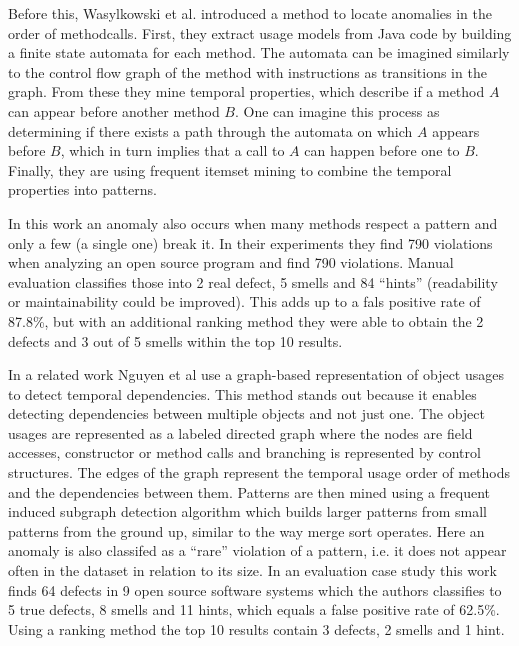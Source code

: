 Before this, Wasylkowski et al. \cite{wasylkowski2007detecting} introduced a method to locate anomalies in the order of methodcalls.
First, they extract usage models from Java code by building a finite state automata for each method.
The automata can be imagined similarly to the control flow graph of the method with instructions as transitions in the graph.
From these they mine temporal properties, which describe if a method $A$ can appear before another method $B$.
One can imagine this process as determining if there exists a path through the automata on which $A$ appears before $B$, which in turn implies that a call to $A$ can happen before one to $B$.
Finally, they are using frequent itemset mining \cite{han2006data} to combine the temporal properties into patterns.

In this work an anomaly also occurs when many methods respect a pattern and only a few (a single one) break it.
In their experiments they find 790 violations when analyzing an open source program and find 790 violations.
Manual evaluation classifies those into 2 real defect, 5 smells and 84 ``hints'' (readability or maintainability could be improved).
This adds up to a fals positive rate of 87.8\%, but with an additional ranking method they were able to obtain the 2 defects and 3 out of 5 smells within the top 10 results.

In a related work Nguyen et al \cite{nguyen2009graph} use a graph-based representation of object usages to detect temporal dependencies.
This method stands out because it enables detecting dependencies between multiple objects and not just one.
The object usages are represented as a labeled directed graph where the nodes are field accesses, constructor or method calls and branching is represented by control structures.
The edges of the graph represent the temporal usage order of methods and the dependencies between them.
Patterns are then mined using a frequent induced subgraph detection algorithm which builds larger patterns from small patterns from the ground up, similar to the way merge sort operates.
Here an anomaly is also classifed as a ``rare'' violation of a pattern, i.e. it does not appear often in the dataset in relation to its size.
In an evaluation case study this work finds 64 defects in 9 open source software systems which the authors classifies to 5 true defects, 8 smells and 11 hints, which equals a false positive rate of 62.5\%.
Using a ranking method the top 10 results contain 3 defects, 2 smells and 1 hint.



